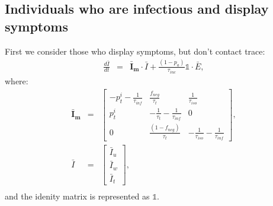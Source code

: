 \documentclass[notitlepage, superscriptaddress]{revtex4-2}
\begin{document}
\subsection{Individuals who are infectious and display symptoms}
First we consider those who display symptoms, but don't contact trace:
\begin{eqnarray}
\frac{d\bar{I}}{dt} &=& \boldsymbol{\bar{I}_{m}} \cdot  \bar{I} + \frac{(1-p_{a})}{\tau_{inc}} \mathbb{1} \cdot \bar{E}, 
\end{eqnarray}
where:
%
\begin{eqnarray}
\boldsymbol{\bar{I}_{m}} &=&
\begin{bmatrix}
- p^{i}_{t} -\frac{1}{\tau_{inf}}  &  \frac{f_{neg}}{\tau_{t}}            & \frac{1}{\tau_{iso}} \\ 
 p^{i}_{t}              & -\frac{1}{\tau_{t}} -\frac{1}{\tau_{inf}}       & 0  \\ 
 0                  & \frac{(1- f_{neg})}{\tau_{t}}                        & -\frac{1}{\tau_{iso}} -\frac{1}{\tau_{inf}}
\end{bmatrix}, \\ 
%
\bar{I} &=& 
\begin{bmatrix}
\bar{I}_{u} \\ \bar{I}_{w}\\ \bar{I}_{t}
\end{bmatrix}, \\ 
%
%
\end{eqnarray}
and the idenity matrix is represented as $\mathbb{1}$.
\end{document}
